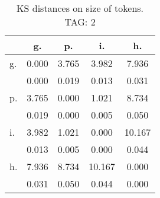\begin{table}[h!]
\begin{center}
\begin{tabular}{| l | c | c | c | c |}\hline
 & g. & p. & i. & h. \\\hline
g. & 0.000  & 3.765  & 3.982  & 7.936 \\\hline
 & 0.000  & 0.019  & 0.013  & 0.031 \\\hline
p. & 3.765  & 0.000  & 1.021  & 8.734 \\\hline
 & 0.019  & 0.000  & 0.005  & 0.050 \\\hline
i. & 3.982  & 1.021  & 0.000  & 10.167 \\\hline
 & 0.013  & 0.005  & 0.000  & 0.044 \\\hline
h. & 7.936  & 8.734  & 10.167  & 0.000 \\\hline
 & 0.031  & 0.050  & 0.044  & 0.000 \\\hline
\end{tabular}
\caption{KS distances on size of tokens. TAG: 2}
\end{center}
\end{table}
